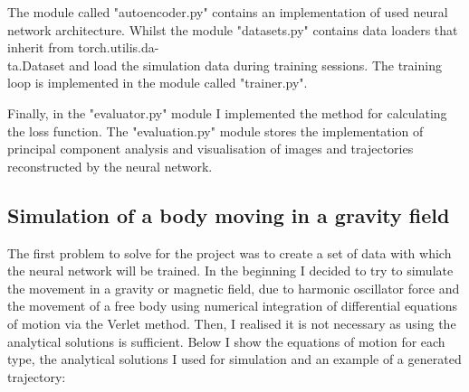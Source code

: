 \documentclass[12pt,letterpaper]{article}
\begin{document}
The module called "autoencoder.py" contains an implementation of used neural network architecture. Whilst the module "datasets.py" contains data loaders that inherit from torch.utilis.da-\\ta.Dataset and load the simulation data during training sessions. The training loop is implemented in the module called "trainer.py".

Finally, in the "evaluator.py" module I implemented the method for calculating the loss function. The "evaluation.py" module stores the implementation of principal component analysis and visualisation of images and trajectories reconstructed by the neural network.  

\subsection{Simulation of a body moving in a gravity field}

The first problem to solve for the project was to create a set of data with which the neural network will be trained. In the beginning I decided to try to simulate the movement in a gravity or magnetic field, due to harmonic oscillator force and the movement of a free body using numerical integration of differential equations of motion via the Verlet method. Then, I realised it is not necessary as using the analytical solutions is sufficient. Below I show the equations of motion for each type, the analytical solutions I used for simulation and an example of a generated trajectory:
\end{document}
